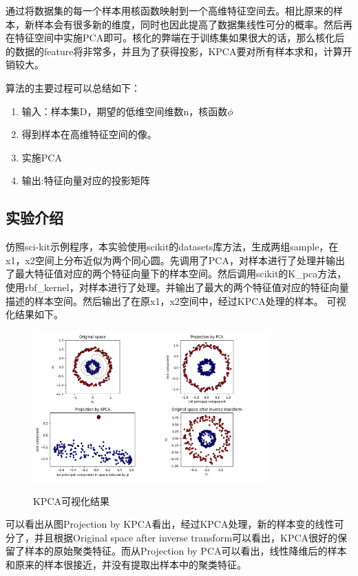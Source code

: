 \documentclass[UTF8]{ctexart}
\begin{document}
通过将数据集的每一个样本用核函数映射到一个高维特征空间去。相比原来的样本，新样本会有很多新的维度，同时也因此提高了数据集线性可分的概率。然后再在特征空间中实施PCA即可。核化的弊端在于训练集如果很大的话，那么核化后的数据的feature将非常多，并且为了获得投影，KPCA要对所有样本求和，计算开销较大。
\vspace{3mm}  

算法的主要过程可以总结如下：



\begin{enumerate}
	\item 输入：样本集D，期望的低维空间维数n，核函数$\phi$
	\item 得到样本在高维特征空间的像。
	\item 实施PCA
	\item 输出:特征向量对应的投影矩阵
\end{enumerate}




\subsection{实验介绍}
仿照sci-kit示例程序，本实验使用scikit的datasets库方法，生成两组sample，在x1，x2空间上分布近似为两个同心圆。先调用了PCA，对样本进行了处理并输出了最大特征值对应的两个特征向量下的样本空间。然后调用scikit的K\_pca方法，使用rbf\_kernel，对样本进行了处理。并输出了最大的两个特征值对应的特征向量描述的样本空间。然后输出了在原x1，x2空间中，经过KPCA处理的样本。
可视化结果如下。

	\begin{figure}[H]
	  \centering
	  \label{fig:Per3A}\includegraphics[width=0.8\textwidth]{Kpca.png}\
	  \caption{KPCA可视化结果}
	  \label{fig:oscil}    
	\end{figure}
	
可以看出从图Projection by KPCA看出，经过KPCA处理，新的样本变的线性可分了，并且根据Original space after inverse transform可以看出，KPCA很好的保留了样本的原始聚类特征。而从Projection by PCA可以看出，线性降维后的样本和原来的样本很接近，并没有提取出样本中的聚类特征。
\end{document}
